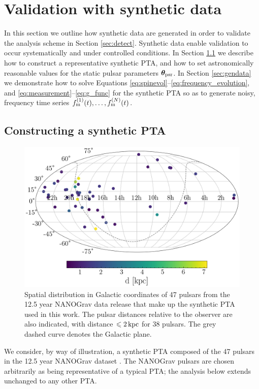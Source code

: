 \documentclass[fleqn,usenatbib,useAMS]{mnras}
\begin{document}
\section{Validation with synthetic data} \label{sec:testing}
In this section we outline how synthetic data are generated in order to validate the analysis scheme in Section \ref{sec:detect}. Synthetic data enable validation to occur systematically and under controlled conditions. In Section \ref{sec:synt_pta} we describe how to construct a representative synthetic PTA, and how to set astronomically reasonable values for the static pulsar parameters $\boldsymbol{\theta}_{\rm psr}$. In Section \ref{sec:gendata} we demonstrate how to solve Equations \eqref{eq:spinevol}--\eqref{eq:frequency_evolution}, and \eqref{eq:measurement}--\eqref{eq:g_func} for the synthetic PTA so as to generate noisy, frequency time series $f_{\rm m}^{(1)}(t), \dots, f_{\rm m}^{(N)}(t) $. 

\subsection{Constructing a synthetic PTA}\label{sec:synt_pta}
\begin{figure}
	\includegraphics[width=\columnwidth]{images/pulsar_distribution}
	\caption{Spatial distribution in Galactic coordinates of 47 pulsars from the 12.5 year NANOGrav data release that make up the synthetic PTA used in this work. The pulsar distances relative to the observer are also indicated, with distance $\leq 2 \, {\rm kpc}$ for $38$ pulsars. The grey dashed curve denotes the Galactic plane.}
	\label{fig:pulsar_distrib}
\end{figure}
We consider, by way of illustration, a synthetic PTA composed of the 47 pulsars in the 12.5 year NANOGrav dataset \citep{2020ApJ...905L..34A}. The NANOGrav pulsars are chosen arbitrarily as being representative of a typical PTA; the analysis below extends unchanged to any other PTA. \newline 
\end{document}
